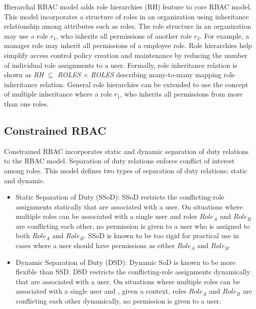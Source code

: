 Hierarchal RBAC model adds role hierarchies (RH) feature to core RBAC model.
This model incorporates a structure of roles in an organization using inheritance relationship among attributes such as roles.
The role structure in an organization may use
a role $r_1$, who inherits all permissions of another role $r_2$.
For example, a manager role may inherit all permissions of a employee role.
Role hierarchies help simplify access control policy creation and maintenance by reducing the number of
individual role assignments to a user. Formally, role inheritance relation is shown as \textit{RH} $\subseteq$ \textit{ROLES} $\times$ \textit{ROLES} describing many-to-many mapping role inheritance relation. 
General role hierarchies can be extended to use the concept of multiple inheritance where
a role $r_1$, who inherits all permissions from more than one roles.


\subsection{Constrained RBAC}

Constrained RBAC incorporates static and dynamic separation of duty relations to the RBAC model. Separation of 
duty relations enforce conflict of interest among roles. This model defines two types of separation of duty relations; static and dynamic.

\begin{itemize}
	\item Static Separation of Duty (SSoD): SSoD restricts the conflicting-role assignments statically that are associated with a user. On situations
	where multiple roles can be associated with a single user and roles $Role_A$ and $Role_B$ are conflicting each other, no permission is given to a user who is assigned to both $Role_A$ and $Role_B$. SSoD is known to be too rigid for practical use in cases where a user should have permissions as either $Role_A$ and $Role_B$.
	\item Dynamic Separation of Duty (DSD): Dynamic SoD is known to be
more flexible than SSD. DSD restricts the conflicting-role assignments dynamically that are associated with a user. On situations
	where multiple roles can be associated with a single user and , given a context, roles $Role_A$ and $Role_B$ are conflicting each other dynamically, no permission is given to a user.	
\end{itemize}
